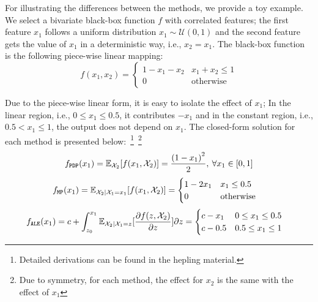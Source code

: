 For illustrating the differences between the methods, we provide a toy example. We select a bivariate black-box function \(f\) with correlated features; the first feature \( x_1 \) follows a uniform distribution \( x_1 \sim \mathcal{U}(0,1)\) and the second feature gets the value of \(x_1\) in a deterministic way, i.e., \( x_2 = x_1 \). The black-box function is the following piece-wise linear mapping:
%
\begin{equation} \label{eq:example-1-mapping} f(x_1, x_2) =
  \begin{cases} 1 - x_1 - x_2 & x_1 + x_2 \leq 1 \\ 0 & \text{otherwise}
  \end{cases}
\end{equation}
\noindent

Due to the piece-wise linear form, it is easy to isolate the effect of \(x_1\); In the linear region, i.e., \(0 \leq x_1 \leq 0.5\), it contributes \(-x_1\) and in the constant region, i.e., \(0.5 < x_1 \leq 1 \), the output does not depend on \(x_1\). The closed-form solution for each method is presented below:~\footnote{Detailed derivations can be found in the hepling material.}~\footnote{ Due to symmetry, for each method, the effect for \(x_2\) is the same with the effect of \(x_1\)}
%
\begin{equation}\label{eq:example-1-pdp} f_{\mathtt{PDP}}(x_1) = \mathbb{\mathbb{E}}_{\mathcal{X}_2}[f(x_1,\mathcal{X}_2)] = \frac{{(1-x_1)}^2}{2}, \: \forall x_1 \in [0,1]
\end{equation}
%
\begin{equation} \label{eq:example-1-mplots}
  \begin{split} f_{\mathtt{MP}}(x_1) &= \mathbb{E}_{\mathcal{X}_2|\mathcal{X}_1 = x_1}[f(x_1, \mathcal{X}_2)] = \begin{cases} 1 - 2x_1 & x_1 \leq 0.5 \\ 0 &\text{otherwise}
    \end{cases}
  \end{split}
\end{equation}
%
\begin{align}\label{eq:example-1-ale}
  \begin{split} f_{\mathtt{ALE}}(x_1) &= c + \int_{z_0}^{x_1} \mathbb{E}_{\mathcal{X}_2|\mathcal{X}_1=z} [\frac{\partial f(z, \mathcal{X}_2)}{\partial z}] \partial z =
     \begin{cases} c - x_1 & 0 \leq x_1 \leq 0.5\\ c - 0.5 & 0.5 \leq x_1 \leq 1
    \end{cases}
  \end{split}
\end{align}

